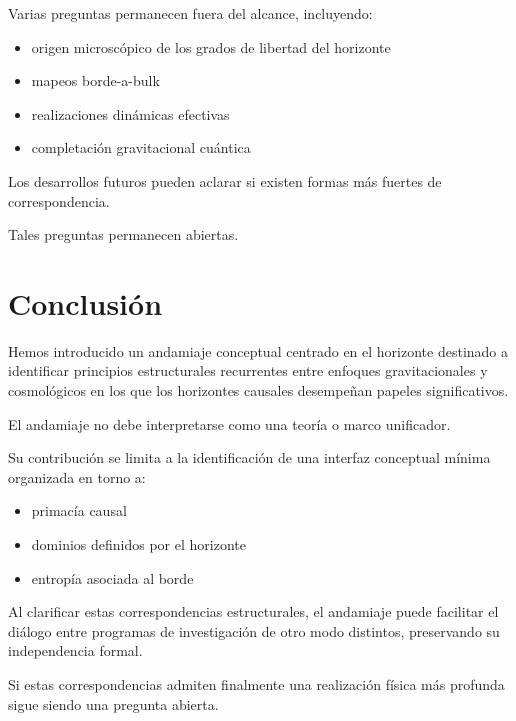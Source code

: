 \documentclass[12pt,a4paper]{article}
\begin{document}
Varias preguntas permanecen fuera del alcance, incluyendo:

\begin{itemize}
  \item origen microscópico de los grados de libertad del horizonte
  \item mapeos borde-a-bulk
  \item realizaciones dinámicas efectivas
  \item completación gravitacional cuántica
\end{itemize}

Los desarrollos futuros pueden aclarar si existen formas más fuertes de correspondencia.

Tales preguntas permanecen abiertas.

\section{Conclusión}

Hemos introducido un andamiaje conceptual centrado en el horizonte destinado a identificar principios estructurales recurrentes entre enfoques gravitacionales y cosmológicos en los que los horizontes causales desempeñan papeles significativos.

El andamiaje no debe interpretarse como una teoría o marco unificador.

Su contribución se limita a la identificación de una interfaz conceptual mínima organizada en torno a:

\begin{itemize}
  \item primacía causal
  \item dominios definidos por el horizonte
  \item entropía asociada al borde
\end{itemize}

Al clarificar estas correspondencias estructurales, el andamiaje puede facilitar el diálogo entre programas de investigación de otro modo distintos, preservando su independencia formal.

Si estas correspondencias admiten finalmente una realización física más profunda sigue siendo una pregunta abierta.
\end{document}
